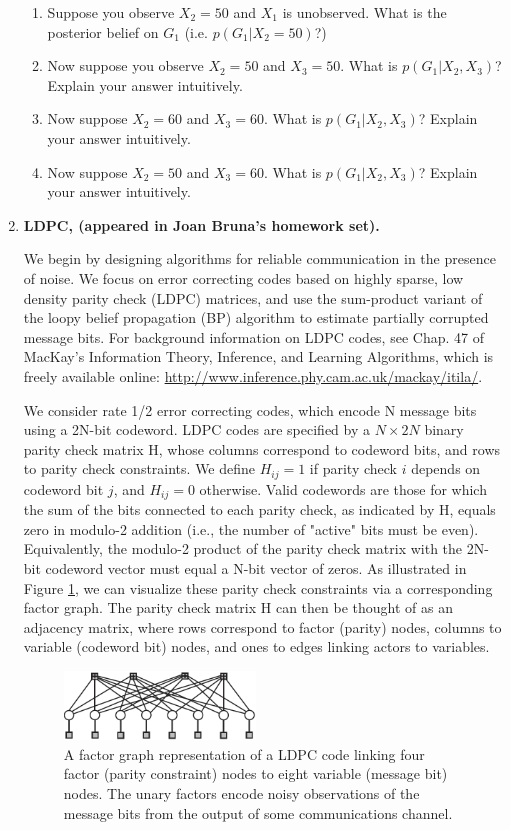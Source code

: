 \documentclass{article}
\begin{document}
\begin{enumerate}
\begin{enumerate}
\item Suppose you observe $X_2=50$ and $X_1$ is unobserved. What is the posterior belief on $G_1$ (i.e. $p(G_1|X_2=50)$?)
\item Now suppose you observe $X_2=50$ and $X_3=50$. What is $p(G_1| X_2, X_3)$? Explain your answer intuitively.
\item Now suppose $X_2=60$ and $X_3=60$. What is $p(G_1| X_2, X_3)$? Explain your answer intuitively.
\item Now suppose $X_2=50$ and $X_3=60$. What is $p(G_1| X_2, X_3)$? Explain your answer intuitively.
\end{enumerate}


\item  {\bf LDPC, (appeared in Joan Bruna's homework set).} 

We begin by designing algorithms for reliable communication in the presence of noise. We
focus on error correcting codes based on highly sparse, low density parity check (LDPC) matrices, and use the sum-product variant of the loopy belief propagation (BP) algorithm
to estimate partially corrupted message bits. For background information on LDPC codes, see Chap. 47 of MacKay's Information Theory, Inference, and Learning Algorithms, which
is freely available online: \url{http://www.inference.phy.cam.ac.uk/mackay/itila/}.

We consider rate 1/2 error correcting codes, which encode N message bits using a 2N-bit codeword. LDPC codes are specified by a $N \times 2N$ binary parity check matrix H,
whose columns correspond to codeword bits, and rows to parity check constraints. We define $H_{ij} = 1$ if parity check $i$ depends on codeword bit $j$, and $H_{ij} = 0$ otherwise. Valid codewords are those for which the sum of the bits connected to each parity check, as indicated by H, equals zero in modulo-2 addition (i.e., the number of "active" bits must be even). Equivalently, the modulo-2 product of the parity check matrix with the 2N-bit codeword vector must equal a N-bit vector of zeros. As illustrated in Figure \ref{fig:factor}, we can visualize these
parity check constraints via a corresponding factor graph. The parity check matrix H can then be thought of as an adjacency matrix, where rows correspond to factor (parity) nodes,
columns to variable (codeword bit) nodes, and ones to edges linking actors to variables.

\begin{figure}[t]
\centering
\includegraphics[width=2in]{brown_hw2}
\caption{A factor graph representation of a LDPC code linking four factor (parity constraint)
nodes to eight variable (message bit) nodes. The unary factors encode noisy observations of the
message bits from the output of some communications channel.}
\label{fig:factor}
\end{figure}


\end{enumerate}
\end{document}
